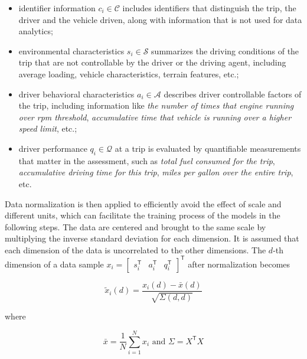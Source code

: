 \documentclass{article}
\begin{document}
\begin{itemize}
    
    \item identifier information $ c_{i} \in \mathcal{C} $ includes identifiers that distinguish the trip, the driver and the vehicle driven, along with information that is not used for data analytics;
    
    \item environmental characteristics $ s_{i} \in \mathcal{S} $ summarizes the driving conditions of the trip that are not controllable by the driver or the driving agent, including average loading, vehicle characteristics, terrain features, etc.;
    
    \item driver behavioral characteristics $ a_{i} \in \mathcal{A} $ describes driver controllable factors of the trip, including information like \textit{the number of times that engine running over rpm threshold}, \textit{accumulative time that vehicle is running over a higher speed limit}, etc.;
    
    \item driver performance $ q_{i} \in \mathcal{Q} $ at a trip is evaluated by quantifiable measurements that matter in the assessment, such as \textit{total fuel consumed for the trip}, \textit{accumulative driving time for this trip}, \textit{miles per gallon over the entire trip}, etc.
    
\end{itemize}

Data normalization is then applied to efficiently avoid the effect of scale and different units, which can facilitate the training process of the models in the following steps. The data are centered and brought to the same scale by multiplying the inverse standard deviation for each dimension. It is assumed that each dimension of the data is uncorrelated to the other dimensions. The $d$-th dimension of a data sample $ x_{i} = \begin{bmatrix} s_{i}^{\mathsf{T}} & a_{i}^{\mathsf{T}} & q_{i}^{\mathsf{T}} \end{bmatrix}^{\mathsf{T}} $ after normalization becomes 

\[
\tilde{x}_{i}(d) = \frac{ x_{i}(d) - \bar{x}(d) }{ \sqrt{\Sigma(d,d)} }
\]

where 

\[
\bar{x} = \frac{1}{N} \sum_{i=1}^{N} x_{i} 
\text{ and } 
\Sigma = X^{\mathsf{T}} X
\]
\end{document}
